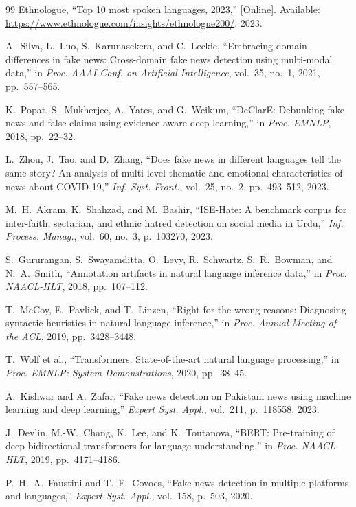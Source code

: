 \documentclass[conference]{IEEEtran}
\begin{document}
\begin{thebibliography}{99}
Ethnologue,
``Top 10 most spoken languages, 2023,''
[Online]. Available: \url{https://www.ethnologue.com/insights/ethnologue200/},
2023.

A.~Silva, L.~Luo, S.~Karunasekera, and C.~Leckie,
``Embracing domain differences in fake news: Cross-domain fake news detection
using multi-modal data,''
in \textit{Proc. AAAI Conf. on Artificial Intelligence}, vol.~35, no.~1, 2021,
pp.~557--565.

K.~Popat, S.~Mukherjee, A.~Yates, and G.~Weikum,
``DeClarE: Debunking fake news and false claims using evidence-aware deep
learning,''
in \textit{Proc. EMNLP}, 2018, pp.~22--32.

L.~Zhou, J.~Tao, and D.~Zhang,
``Does fake news in different languages tell the same story? An analysis of
multi-level thematic and emotional characteristics of news about COVID-19,''
\textit{Inf. Syst. Front.}, vol.~25, no.~2, pp.~493--512, 2023.

M.~H.~Akram, K.~Shahzad, and M.~Bashir,
``ISE-Hate: A benchmark corpus for inter-faith, sectarian, and ethnic hatred
detection on social media in Urdu,''
\textit{Inf. Process. Manag.}, vol.~60, no.~3, p.~103270, 2023.

S.~Gururangan, S.~Swayamditta, O.~Levy, R.~Schwartz, S.~R.~Bowman, and
N.~A.~Smith,
``Annotation artifacts in natural language inference data,''
in \textit{Proc. NAACL-HLT}, 2018, pp.~107--112.

T.~McCoy, E.~Pavlick, and T.~Linzen,
``Right for the wrong reasons: Diagnosing syntactic heuristics in natural
language inference,''
in \textit{Proc. Annual Meeting of the ACL}, 2019, pp.~3428--3448.

T.~Wolf et al.,
``Transformers: State-of-the-art natural language processing,''
in \textit{Proc. EMNLP: System Demonstrations}, 2020, pp.~38--45.

A.~Kishwar and A.~Zafar,
``Fake news detection on Pakistani news using machine learning and deep
learning,''
\textit{Expert Syst. Appl.}, vol.~211, p.~118558, 2023.

J.~Devlin, M.-W.~Chang, K.~Lee, and K.~Toutanova,
``BERT: Pre-training of deep bidirectional transformers for language
understanding,''
in \textit{Proc. NAACL-HLT}, 2019, pp.~4171--4186.

P.~H.~A.~Faustini and T.~F.~Covoes,
``Fake news detection in multiple platforms and languages,''
\textit{Expert Syst. Appl.}, vol.~158, p.~503, 2020.


\end{thebibliography}
\end{document}
